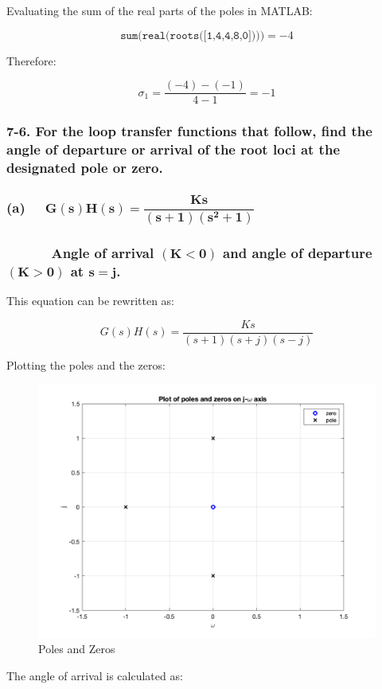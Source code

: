 \documentclass[12pt, letterpaper]{../assignment}
\begin{document}
Evaluating the sum of the real parts of the poles in MATLAB:

$$ \texttt{sum(real(roots([1,4,4,8,0])))} = -4 $$

Therefore:

\begin{answer}
$$ \sigma_1 = \frac{(-4)-(-1) }{4-1} = -1 $$
\end{answer}

\subsubsection*{7-6. For the loop transfer functions that follow, find the angle of departure or arrival of the root loci at the designated pole or zero.}
\subsubsection*{(a) \ \  $ \mathbf{G(s)H(s) = \dfrac{K s}{(s+1)(s^2+1)}}$}
\subsubsection*{ \ \ \ \ \ \ Angle of arrival $\mathbf{(K < 0)}$ and angle of departure $ \mathbf{(K > 0)}$ at $ \mathbf{s = j}$.}

This equation can be rewritten as:

$$ G(s)H(s) = \dfrac{K s}{(s+1)(s+j)(s-j)} $$

Plotting the poles and the zeros:

\begin{figure}[H]
    \centering
    \includegraphics[width=0.7\linewidth]{./figures/7-6-a_poles_and_zeros.png}
    \caption{Poles and Zeros}
    \label{fig:step}
\end{figure}

The angle of arrival is calculated as:
\end{document}
